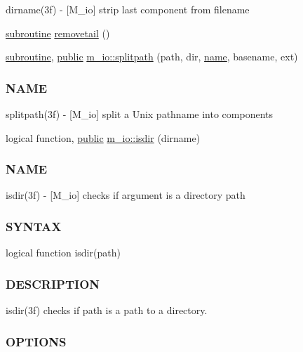 \begin{DoxyCompactItemize}
\begin{DoxyCompactList}
dirname(3f) -\/ \mbox{[}M\+\_\+io\mbox{]} strip last component from filename \end{DoxyCompactList}\item 
\hyperlink{M__stopwatch_83_8txt_acfbcff50169d691ff02d4a123ed70482}{subroutine} \hyperlink{M__io_8f90_af19c15eaa4f2a0ca08d241277ce7c256}{removetail} ()
\item 
\hyperlink{M__stopwatch_83_8txt_acfbcff50169d691ff02d4a123ed70482}{subroutine}, \hyperlink{M__stopwatch_83_8txt_a2f74811300c361e53b430611a7d1769f}{public} \hyperlink{namespacem__io_a7d1857c5c839bf3e096ce68fa1447d44}{m\+\_\+io\+::splitpath} (path, dir, \hyperlink{M__stopwatch_83_8txt_a3f508a893ae4c3b397b4383e33b9bcae}{name}, basename, ext)
\begin{DoxyCompactList}\small\item\em \subsubsection*{N\+A\+ME}

splitpath(3f) -\/ \mbox{[}M\+\_\+io\mbox{]} split a Unix pathname into components \end{DoxyCompactList}\item 
logical function, \hyperlink{M__stopwatch_83_8txt_a2f74811300c361e53b430611a7d1769f}{public} \hyperlink{namespacem__io_a6793f5adc45177098781af4be39911ff}{m\+\_\+io\+::isdir} (dirname)
\begin{DoxyCompactList}\small\item\em \subsubsection*{N\+A\+ME}

isdir(3f) -\/ \mbox{[}M\+\_\+io\mbox{]} checks if argument is a directory path \subsubsection*{S\+Y\+N\+T\+AX}

logical function isdir(path) \subsubsection*{D\+E\+S\+C\+R\+I\+P\+T\+I\+ON}

isdir(3f) checks if path is a path to a directory. \subsubsection*{O\+P\+T\+I\+O\+NS}


\end{DoxyCompactList}
\end{DoxyCompactItemize}

